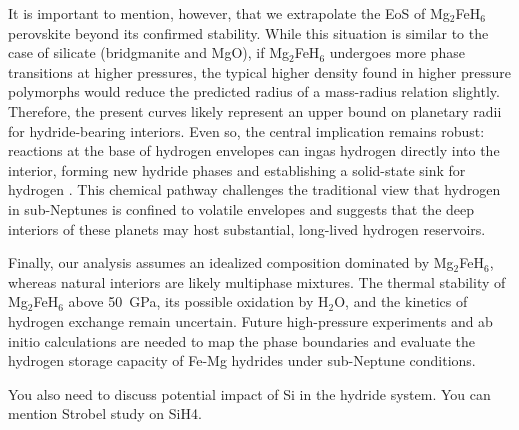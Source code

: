 \documentclass[draft,jgrga,12pt]{agujournal2019}
\begin{document}
It is important to mention, however, that we extrapolate the EoS of Mg$_2$FeH$_6$ perovskite beyond its confirmed stability.
While this situation is similar to the case of silicate (bridgmanite and MgO), if Mg$_2$FeH$_6$ undergoes more phase transitions at higher pressures, the typical higher density found in higher pressure polymorphs would reduce the predicted radius of a mass-radius relation slightly.  
Therefore, the present curves likely represent an upper bound on planetary radii for hydride-bearing interiors. 
Even so, the central implication remains robust: reactions at the base of hydrogen envelopes can ingas hydrogen directly into the interior, forming new hydride phases and establishing a solid-state sink for hydrogen \cite{kim_stability_2023}. 
This chemical pathway challenges the traditional view that hydrogen in sub-Neptunes is confined to volatile envelopes and suggests that the deep interiors of these planets may host substantial, long-lived hydrogen reservoirs.


Finally, our analysis assumes an idealized composition dominated by Mg$_2$FeH$_6$, whereas natural interiors are likely multiphase mixtures. 
The thermal stability of Mg$_2$FeH$_6$ above 50~{GPa}, its possible oxidation by H$_2$O, and the kinetics of hydrogen exchange remain uncertain. 
Future high-pressure experiments and ab initio calculations are needed to map the phase boundaries and evaluate the hydrogen storage capacity of Fe-Mg hydrides under sub-Neptune conditions.
\begin{cbox}
    You also need to discuss potential impact of Si in the hydride system.  You can mention Strobel study on SiH4.
\end{cbox}


\clearpage




\end{document}

